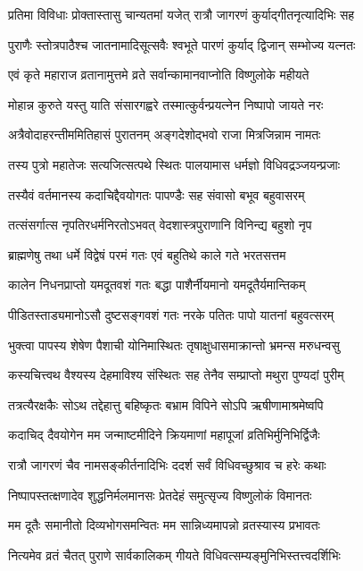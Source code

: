 \twolineshloka
{प्रतिमा विविधाः प्रोक्तास्तासु चान्यतमां यजेत्}
{रात्रौ जागरणं कुर्याद्गीतनृत्यादिभिः सह}%

\twolineshloka
{पुराणैः स्तोत्रपाठैश्च जातनामादिसूत्सवैः}
{श्वभूते पारणं कुर्याद् द्विजान् सम्भोज्य यत्नतः}%

\twolineshloka
{एवं कृते महाराज व्रतानामुत्तमे व्रते}
{सर्वान्कामानवाप्नोति विष्णुलोके महीयते}%

\twolineshloka
{मोहान्न कुरुते यस्तु याति संसारगह्वरे}
{तस्मात्कुर्वन्प्रयत्नेन निष्पापो जायते नरः}%

\twolineshloka
{अत्रैवोदाहरन्तीममितिहासं पुरातनम्}
{अङ्गदेशोद्भवो राजा मित्रजिन्नाम नामतः}%

\twolineshloka
{तस्य पुत्रो महातेजः सत्यजित्सत्पथे स्थितः}
{पालयामास धर्मज्ञो विधिवद्रञ्जयन्प्रजाः}%

\twolineshloka
{तस्यैवं वर्तमानस्य कदाचिद्दैवयोगतः}
{पापण्डैः सह संवासो बभूव बहुवासरम्}%

\twolineshloka
{तत्संसर्गात्स नृपतिरधर्मनिरतोऽभवत्}
{वेदशास्त्रपुराणानि विनिन्द्य बहुशो नृप}%

\twolineshloka
{ब्राह्मणेषु तथा धर्मे विद्वेषं परमं गतः}
{एवं बहुतिथे काले गते भरतसत्तम}%

\twolineshloka
{कालेन निधनप्राप्तो यमदूतवशं गतः}
{बद्धा पाशैर्नीयमानो यमदूतैर्यमान्तिकम्}%

\twolineshloka
{पीडितस्ताड्यमानोऽसौ दुष्टसङ्गवशं गतः}
{नरके पतितः पापो यातनां बहुवत्सरम्}%

\twolineshloka
{भुक्त्वा पापस्य शेषेण पैशाची योनिमास्थितः}
{तृषाक्षुधासमाक्रान्तो भ्रमन्स मरुधन्वसु}%

\twolineshloka
{कस्यचित्त्वथ वैश्यस्य देहमाविश्य संस्थितः}
{सह तेनैव सम्प्राप्तो मथुरा पुण्यदां पुरीम्}%

\twolineshloka
{तत्रत्यैरक्षकैः सोऽथ तद्देहात्तु बहिष्कृतः}
{बभ्राम विपिने सोऽपि ऋषीणामाश्रमेष्वपि}%

\twolineshloka
{कदाचिद् दैवयोगेन मम जन्माष्टमीदिने}
{क्रियमाणां महापूजां व्रतिभिर्मुनिभिर्द्विजैः}%

\twolineshloka
{रात्रौ जागरणं चैव नामसङ्कीर्तनादिभिः}
{ददर्श सर्वं विधिवच्छुश्राव च हरेः कथाः}%

\twolineshloka
{निष्पापस्तत्क्षणादेव शुद्धनिर्मलमानसः}
{प्रेतदेहं समुत्सृज्य विष्णुलोकं विमानतः}%

\twolineshloka
{मम दूतैः समानीतो दिव्यभोगसमन्वितः}
{मम सान्निध्यमापन्नो व्रतस्यास्य प्रभावतः}%

\twolineshloka
{नित्यमेव व्रतं चैतत् पुराणे सार्वकालिकम्}
{गीयते विधिवत्सम्यङ्मुनिभिस्तत्त्वदर्शिभिः}%

